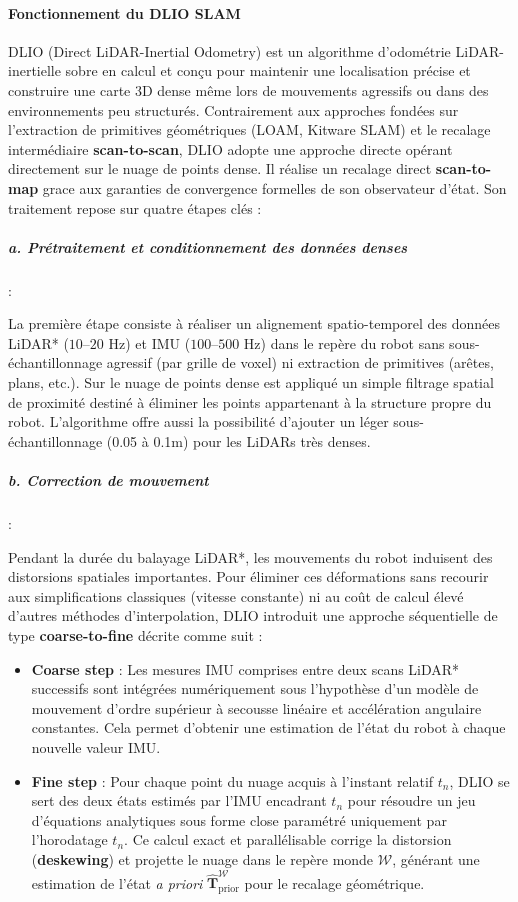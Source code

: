 \paragraph{Fonctionnement du DLIO SLAM}

DLIO (Direct LiDAR-Inertial Odometry) \cite{dlio_slam} est un algorithme d'odométrie LiDAR-inertielle sobre en calcul et conçu pour maintenir une localisation précise et construire une carte 3D dense même lors de mouvements agressifs ou dans des environnements peu structurés. Contrairement aux approches fondées sur l'extraction de primitives géométriques (LOAM, Kitware SLAM) et le recalage intermédiaire \textbf{scan-to-scan}, DLIO adopte une approche directe opérant directement sur le nuage de points dense. Il réalise un recalage direct \textbf{scan-to-map} grace aux garanties de convergence formelles de son observateur d'état. Son traitement repose sur quatre étapes clés :

\subparagraph{a. Prétraitement et conditionnement des données denses}:

La première étape consiste à réaliser un alignement spatio-temporel des données LiDAR* ($10\text{--}20\text{ Hz}$) et IMU ($100\text{--}500\text{ Hz}$) dans le repère du robot sans sous-échantillonnage agressif (par grille de voxel) ni extraction de primitives (arêtes, plans, etc.). Sur le nuage de points dense est appliqué un simple filtrage spatial de proximité destiné à éliminer les points appartenant à la structure propre du robot. L'algorithme offre aussi la possibilité d'ajouter un léger sous-échantillonnage (0.05 à 0.1m) pour les LiDARs très denses.
    
\subparagraph{b. Correction de mouvement}:

Pendant la durée du balayage LiDAR*, les mouvements du robot induisent des distorsions spatiales importantes. Pour éliminer ces déformations sans recourir aux simplifications classiques (vitesse constante) ni au coût de calcul élevé d'autres méthodes d'interpolation, DLIO introduit une approche séquentielle de type \textbf{coarse-to-fine} \cite{coarse_to_fine} décrite comme suit :\\

\begin{itemize}
    \item \textbf{Coarse step} : Les mesures IMU comprises entre deux scans LiDAR* successifs sont intégrées numériquement sous l'hypothèse d'un modèle de mouvement d'ordre supérieur à secousse linéaire et accélération angulaire constantes. Cela permet d'obtenir une estimation de l'état du robot à chaque nouvelle valeur IMU.
    \item \textbf{Fine step} : Pour chaque point du nuage acquis à l'instant relatif $t_n$, DLIO se sert des deux états estimés par l'IMU encadrant $t_n$ pour résoudre un jeu d'équations analytiques sous forme close paramétré uniquement par l'horodatage $t_n$. Ce calcul exact et parallélisable corrige la distorsion (\textbf{deskewing}) et projette le nuage dans le repère monde $\mathcal{W}$, générant une estimation de l'état \textit{a priori} $\hat{\mathbf{T}}_{\text{prior}}^{\mathcal{W}}$ pour le recalage géométrique.\\
\end{itemize}
    
